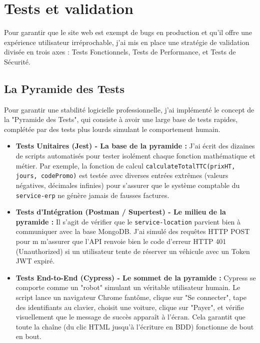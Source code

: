 \chapter{Tests et validation}

Pour garantir que le site web est exempt de bugs en production et qu'il offre une expérience utilisateur irréprochable, j'ai mis en place une stratégie de validation divisée en trois axes : Tests Fonctionnels, Tests de Performance, et Tests de Sécurité.

\section{La Pyramide des Tests}
Pour garantir une stabilité logicielle professionnelle, j'ai implémenté le concept de la "Pyramide des Tests", qui consiste à avoir une large base de tests rapides, complétée par des tests plus lourds simulant le comportement humain.

\begin{itemize}
    \item \textbf{Tests Unitaires (Jest) - La base de la pyramide :} J'ai écrit des dizaines de scripts automatisés pour tester isolément chaque fonction mathématique et métier. Par exemple, la fonction de calcul \texttt{calculateTotalTTC(prixHT, jours, codePromo)} est testée avec diverses entrées extrêmes (valeurs négatives, décimales infinies) pour s'assurer que le système comptable du \texttt{service-erp} ne génère jamais de fausses factures.
    \item \textbf{Tests d'Intégration (Postman / Supertest) - Le milieu de la pyramide :} Il s'agit de vérifier que le \texttt{service-location} parvient bien à communiquer avec la base MongoDB. J'ai simulé des requêtes HTTP POST pour m m'assurer que l'API renvoie bien le code d'erreur HTTP 401 (Unauthorized) si un utilisateur tente de réserver un véhicule avec un Token JWT expiré.
    \item \textbf{Tests End-to-End (Cypress) - Le sommet de la pyramide :} Cypress se comporte comme un "robot" simulant un véritable utilisateur humain. Le script lance un navigateur Chrome fantôme, clique sur "Se connecter", tape des identifiants au clavier, choisit une voiture, clique sur "Payer", et vérifie visuellement que le message de succès apparaît à l'écran. Cela garantit que toute la chaîne (du clic HTML jusqu'à l'écriture en BDD) fonctionne de bout en bout.
\end{itemize}

